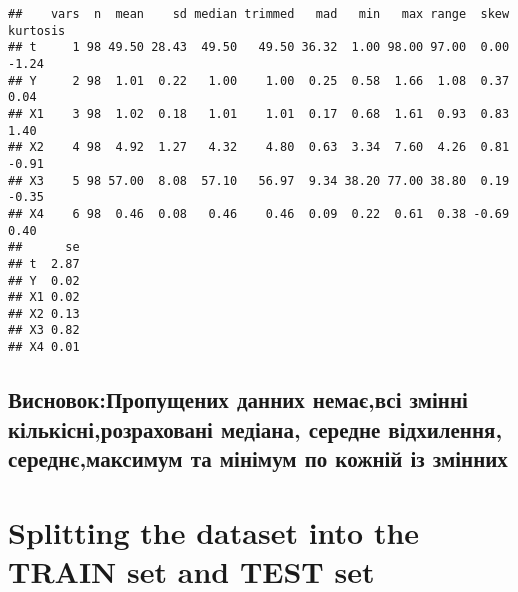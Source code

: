 \documentclass[]{article}
\newenvironment{Shaded}{\begin{snugshade}}{\end{snugshade}}
\newcommand{\KeywordTok}[1]{\textcolor[rgb]{0.13,0.29,0.53}{\textbf{#1}}}
\newcommand{\DataTypeTok}[1]{\textcolor[rgb]{0.13,0.29,0.53}{#1}}
\newcommand{\DecValTok}[1]{\textcolor[rgb]{0.00,0.00,0.81}{#1}}
\newcommand{\FloatTok}[1]{\textcolor[rgb]{0.00,0.00,0.81}{#1}}
\newcommand{\StringTok}[1]{\textcolor[rgb]{0.31,0.60,0.02}{#1}}
\newcommand{\CommentTok}[1]{\textcolor[rgb]{0.56,0.35,0.01}{\textit{#1}}}
\newcommand{\OtherTok}[1]{\textcolor[rgb]{0.56,0.35,0.01}{#1}}
\newcommand{\OperatorTok}[1]{\textcolor[rgb]{0.81,0.36,0.00}{\textbf{#1}}}
\newcommand{\NormalTok}[1]{#1}
\begin{document}
\begin{verbatim}
##    vars  n  mean    sd median trimmed   mad   min   max range  skew kurtosis
## t     1 98 49.50 28.43  49.50   49.50 36.32  1.00 98.00 97.00  0.00    -1.24
## Y     2 98  1.01  0.22   1.00    1.00  0.25  0.58  1.66  1.08  0.37     0.04
## X1    3 98  1.02  0.18   1.01    1.01  0.17  0.68  1.61  0.93  0.83     1.40
## X2    4 98  4.92  1.27   4.32    4.80  0.63  3.34  7.60  4.26  0.81    -0.91
## X3    5 98 57.00  8.08  57.10   56.97  9.34 38.20 77.00 38.80  0.19    -0.35
## X4    6 98  0.46  0.08   0.46    0.46  0.09  0.22  0.61  0.38 -0.69     0.40
##      se
## t  2.87
## Y  0.02
## X1 0.02
## X2 0.13
## X3 0.82
## X4 0.01
\end{verbatim}

\subsection{Висновок:Пропущених данних немає,всі змінні
кількісні,розраховані медіана, середне відхилення, середнє,максимум та
мінімум по кожній із
змінних}\label{ux432ux438ux441ux43dux43eux432ux43eux43aux43fux440ux43eux43fux443ux449ux435ux43dux438ux445-ux434ux430ux43dux43dux438ux445-ux43dux435ux43cux430ux454ux432ux441ux456-ux437ux43cux456ux43dux43dux456-ux43aux456ux43bux44cux43aux456ux441ux43dux456ux440ux43eux437ux440ux430ux445ux43eux432ux430ux43dux456-ux43cux435ux434ux456ux430ux43dux430-ux441ux435ux440ux435ux434ux43dux435-ux432ux456ux434ux445ux438ux43bux435ux43dux43dux44f-ux441ux435ux440ux435ux434ux43dux454ux43cux430ux43aux441ux438ux43cux443ux43c-ux442ux430-ux43cux456ux43dux456ux43cux443ux43c-ux43fux43e-ux43aux43eux436ux43dux456ux439-ux456ux437-ux437ux43cux456ux43dux43dux438ux445}

\section{Splitting the dataset into the TRAIN set and TEST
set}\label{splitting-the-dataset-into-the-train-set-and-test-set}

\begin{Shaded}
\end{Shaded}
\end{document}
